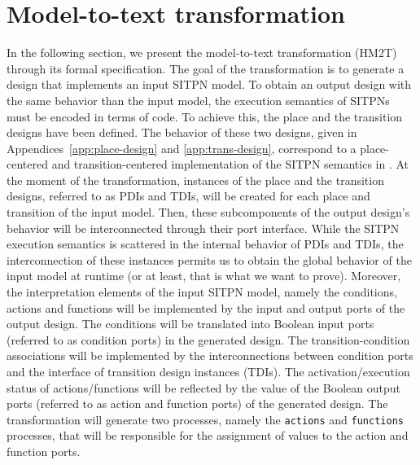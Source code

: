 \documentclass[pdflatex,sn-mathphys]{sn-jnl}%
\theoremstyle{thmstyleone}%
\theoremstyle{thmstyletwo}%
\theoremstyle{thmstylethree}%
\begin{document}
\section{Model-to-text transformation}
\label{sec:m2t}

In the following section, we present the \hilecop{} model-to-text
transformation (HM2T) through its formal specification. The goal of
the transformation is to generate a \hvhdl{} design that implements an
input SITPN model. To obtain an output design with the same behavior
than the input model, the execution semantics of SITPNs must be
encoded in terms of \vhdl{} code. To achieve this, the place and the
transition designs have been defined. The behavior of these two
designs, given in Appendices~\ref{app:place-design} and
\ref{app:trans-design}, correspond to a place-centered and
transition-centered implementation of the SITPN semantics in
\vhdl{}. At the moment of the transformation, instances of the place
and the transition designs, referred to as PDIs and TDIs, will be
created for each place and transition of the input model. Then, these
subcomponents of the output design's behavior will be interconnected
through their port interface.  While the SITPN execution semantics is
scattered in the internal behavior of PDIs and TDIs, the
interconnection of these instances permits us to obtain the global
behavior of the input model at runtime (or at least, that is what we
want to prove). Moreover, the interpretation elements of the input
SITPN model, namely the conditions, actions and functions will be
implemented by the input and output ports of the output design. The
conditions will be translated into Boolean input ports (referred to as
condition ports) in the generated design. The transition-condition
associations will be implemented by the interconnections between
condition ports and the interface of transition design instances
(TDIs). The activation/execution status of actions/functions will be
reflected by the value of the Boolean output ports (referred to as
action and function ports) of the generated design. The transformation
will generate two processes, namely the \texttt{actions} and
\texttt{functions} processes, that will be responsible for the
assignment of values to the action and function ports.
\end{document}
